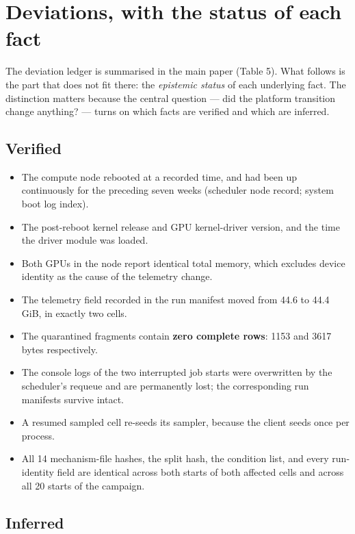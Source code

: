 \documentclass[10pt]{article}
\begin{document}


\section{Deviations, with the status of each fact}

The deviation ledger is summarised in the main paper (Table 5). What follows is the part that does not fit there:
the \emph{epistemic status} of each underlying fact. The distinction matters because the central question --- did
the platform transition change anything? --- turns on which facts are verified and which are inferred.

\subsection{Verified}

\begin{itemize}[leftmargin=1.4em,itemsep=1pt]
\item The compute node rebooted at a recorded time, and had been up continuously for the preceding seven weeks
(scheduler node record; system boot log index).
\item The post-reboot kernel release and GPU kernel-driver version, and the time the driver module was loaded.
\item Both GPUs in the node report identical total memory, which excludes device identity as the cause of the
telemetry change.
\item The telemetry field recorded in the run manifest moved from 44.6 to 44.4\,GiB, in exactly two cells.
\item The quarantined fragments contain \textbf{zero complete rows}: 1153 and 3617 bytes respectively.
\item The console logs of the two interrupted job starts were overwritten by the scheduler's requeue and are
permanently lost; the corresponding run manifests survive intact.
\item A resumed sampled cell re-seeds its sampler, because the client seeds once per process.
\item All 14 mechanism-file hashes, the split hash, the condition list, and every run-identity field are identical
across both starts of both affected cells and across all 20 starts of the campaign.
\end{itemize}

\subsection{Inferred}
\end{document}
